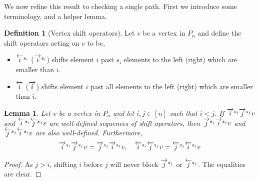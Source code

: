 \documentclass{amsart}
\newtheorem{lemma}[theorem]{Lemma}
\theoremstyle{definition}
\newtheorem{definition}[theorem]{Definition}
\newcommand{\rightshift}[1]{\overrightarrow{\vphantom{1}{#1}}}
\newcommand{\rightshiftk}[2]{\overrightarrow{\vphantom{1}{#1}}^{#2}}
\newcommand{\leftshift}[1]{\overleftarrow{\vphantom{1}{#1}}}
\newcommand{\leftshiftk}[2]{\overleftarrow{\vphantom{1}{#1}}^{#2}}
\begin{document}
We now refine this result to checking a single path.
First we introduce some terminology, and a helper lemma.

\begin{definition}[Vertex shift operators]
Let $v$ be a vertex in $P_n$ and define the shift operators acting on $v$ to be,
\begin{itemize}
    \item $\leftshiftk{i}{s_i}$ ($\rightshiftk{i}{s_i}$) shifts element $i$ past $s_i$ elements to the left (right) which are smaller than $i$.
    \item $\leftshift{i}$ ($\rightshift{i}$) shifts element $i$ past all elements to the left (right) which are smaller than $i$.
\end{itemize}
\end{definition}

\begin{lemma}\label{lem:Interchanging shift operators}
Let $v$ be a vertex in $P_n$ and let $i,j \in [n]$ such that $i<j$. If $\rightshiftk{i}{s_i}\rightshiftk{j}{s_j} v$ and $\leftshiftk{i}{s_i}\leftshiftk{j}{s_j} v$ are well-defined sequences of shift operators, then $\rightshiftk{j}{s_j}\rightshiftk{i}{s_i} v$ and $\leftshiftk{j}{s_j}\leftshiftk{i}{s_i} v$ are also well-defined.
Furthermore,
\begin{align*}
    \rightshiftk{i}{s_i}\rightshiftk{j}{s_j} v = \rightshiftk{j}{s_j}\rightshiftk{i}{s_i} v, \quad 
    \leftshiftk{i}{s_i}\leftshiftk{j}{s_j} v = \leftshiftk{j}{s_j}\leftshiftk{i}{s_i} v
\end{align*}
\end{lemma}
\begin{proof}
As $j>i$, shifting $i$ before $j$ will never block $\rightshiftk{j}{s_j}$ or $\leftshiftk{j}{s_j}$. The equalities are clear.
\end{proof}
\end{document}
